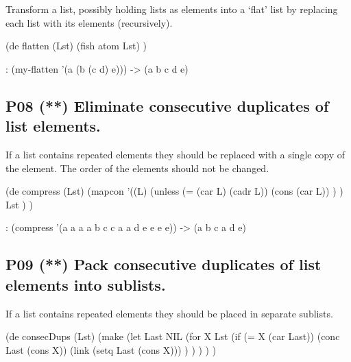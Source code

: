Transform a list, possibly holding lists as elements into a `flat' list
by replacing each list with its elements (recursively).

\begin{wideverbatim}

(de flatten (Lst)
   (fish atom Lst) )

\end{wideverbatim}

\begin{wideverbatim}
   : (my-flatten '(a (b (c d) e)))
   -> (a b c d e)
\end{wideverbatim}


\subsection*{{P08} (**) Eliminate consecutive duplicates
of list elements.}
\label{sec:99-problems-P08}

If a list contains repeated elements they should be replaced with a
single copy of the element. The order of the elements should not be
changed.

\begin{wideverbatim}

(de compress (Lst)
   (mapcon
      '((L)
         (unless (= (car L) (cadr L))
            (cons (car L)) ) )
      Lst ) )

\end{wideverbatim}

\begin{wideverbatim}
   : (compress '(a a a a b c c a a d e e e e))
   -> (a b c a d e)
\end{wideverbatim}


\pagebreak{}
\subsection*{{P09} (**) Pack consecutive duplicates of
list elements into sublists.}
\label{sec:99-problems-P09}

If a list contains repeated elements they should be placed in separate
sublists.

\begin{wideverbatim}

(de consecDups (Lst)
   (make
      (let Last NIL
         (for X Lst
            (if (= X (car Last))
               (conc Last (cons X))
               (link (setq Last (cons X))) ) ) ) ) )

\end{wideverbatim}

